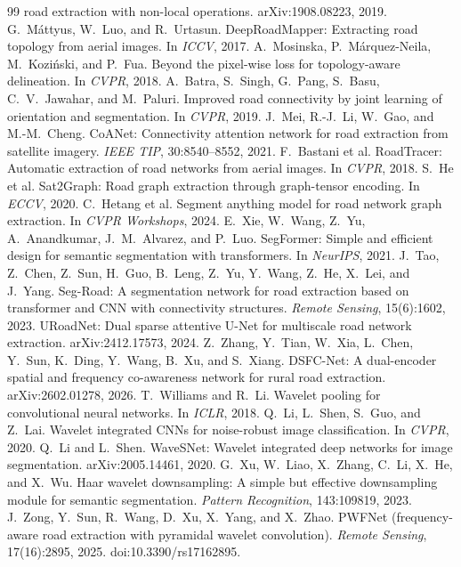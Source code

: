 \documentclass[11pt]{article}
\begin{document}
\begin{thebibliography}{99}
  road extraction with non-local operations. arXiv:1908.08223, 2019.
 G.~M\'attyus, W.~Luo, and R.~Urtasun. DeepRoadMapper: Extracting road
  topology from aerial images. In \emph{ICCV}, 2017.
 A.~Mosinska, P.~M\'arquez-Neila, M.~Kozi\'nski, and P.~Fua. Beyond the
  pixel-wise loss for topology-aware delineation. In \emph{CVPR}, 2018.
 A.~Batra, S.~Singh, G.~Pang, S.~Basu, C.~V.~Jawahar, and M.~Paluri. Improved
  road connectivity by joint learning of orientation and segmentation. In \emph{CVPR}, 2019.
 J.~Mei, R.-J.~Li, W.~Gao, and M.-M.~Cheng. CoANet: Connectivity attention network
  for road extraction from satellite imagery. \emph{IEEE TIP}, 30:8540--8552, 2021.
 F.~Bastani et al. RoadTracer: Automatic extraction of road networks from
  aerial images. In \emph{CVPR}, 2018.
 S.~He et al. Sat2Graph: Road graph extraction through graph-tensor
  encoding. In \emph{ECCV}, 2020.
 C.~Hetang et al. Segment anything model for road network graph extraction.
  In \emph{CVPR Workshops}, 2024.
 E.~Xie, W.~Wang, Z.~Yu, A.~Anandkumar, J.~M.~Alvarez, and P.~Luo.
  SegFormer: Simple and efficient design for semantic segmentation with transformers. In
  \emph{NeurIPS}, 2021.
 J.~Tao, Z.~Chen, Z.~Sun, H.~Guo, B.~Leng, Z.~Yu, Y.~Wang, Z.~He, X.~Lei, and
  J.~Yang. Seg-Road: A segmentation network for road extraction based on transformer and CNN with
  connectivity structures. \emph{Remote Sensing}, 15(6):1602, 2023.
 URoadNet: Dual sparse attentive U-Net for multiscale road network
  extraction. arXiv:2412.17573, 2024.
 Z.~Zhang, Y.~Tian, W.~Xia, L.~Chen, Y.~Sun, K.~Ding, Y.~Wang, B.~Xu, and
  S.~Xiang. DSFC-Net: A dual-encoder spatial and frequency co-awareness network for rural road
  extraction. arXiv:2602.01278, 2026.
 T.~Williams and R.~Li. Wavelet pooling for convolutional neural networks.
  In \emph{ICLR}, 2018.
 Q.~Li, L.~Shen, S.~Guo, and Z.~Lai. Wavelet integrated CNNs for
  noise-robust image classification. In \emph{CVPR}, 2020.
 Q.~Li and L.~Shen. WaveSNet: Wavelet integrated deep networks for image
  segmentation. arXiv:2005.14461, 2020.
 G.~Xu, W.~Liao, X.~Zhang, C.~Li, X.~He, and X.~Wu. Haar wavelet downsampling:
  A simple but effective downsampling module for semantic segmentation. \emph{Pattern
  Recognition}, 143:109819, 2023.
 J.~Zong, Y.~Sun, R.~Wang, D.~Xu, X.~Yang, and X.~Zhao. PWFNet
  (frequency-aware road extraction with pyramidal wavelet convolution). \emph{Remote Sensing},
  17(16):2895, 2025. doi:10.3390/rs17162895.
\end{thebibliography}
\end{document}
